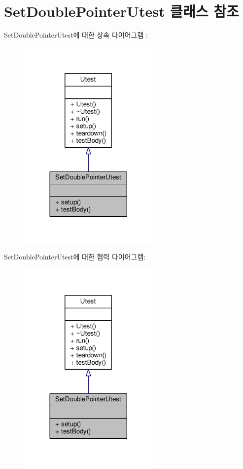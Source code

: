 \hypertarget{class_set_double_pointer_utest}{}\section{Set\+Double\+Pointer\+Utest 클래스 참조}
\label{class_set_double_pointer_utest}


Set\+Double\+Pointer\+Utest에 대한 상속 다이어그램 \+: 
\nopagebreak
\begin{figure}[H]
\begin{center}
\leavevmode
\includegraphics[width=197pt]{class_set_double_pointer_utest__inherit__graph}
\end{center}
\end{figure}


Set\+Double\+Pointer\+Utest에 대한 협력 다이어그램\+:
\nopagebreak
\begin{figure}[H]
\begin{center}
\leavevmode
\includegraphics[width=197pt]{class_set_double_pointer_utest__coll__graph}
\end{center}
\end{figure}
